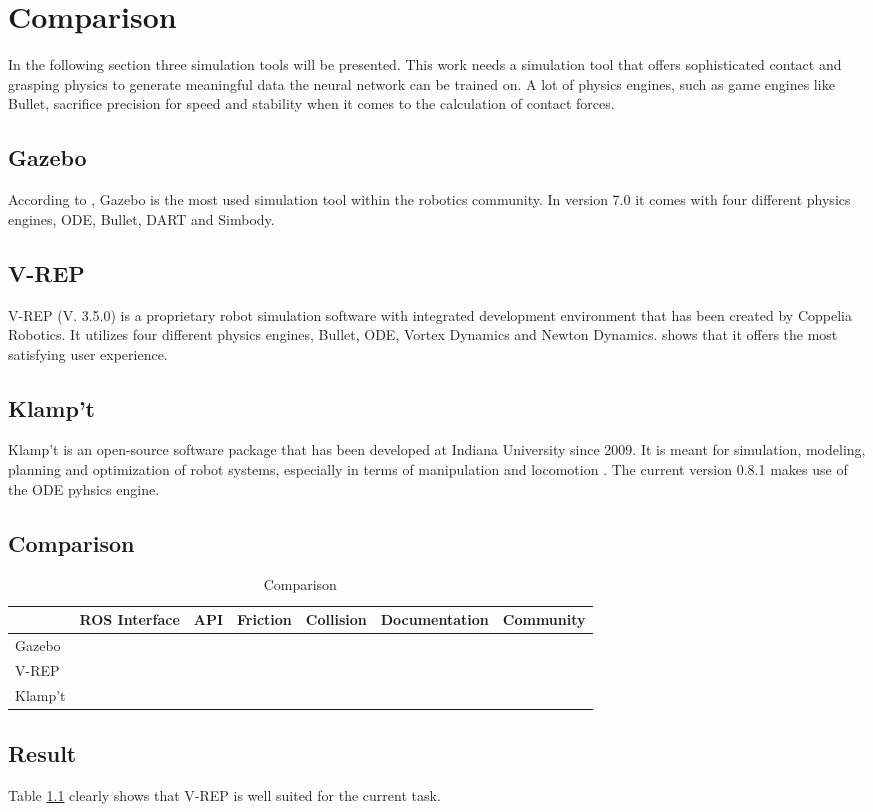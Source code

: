 \chapter{Comparison}
\label{chp:comparison}
In the following section three simulation tools will be presented. This work needs a simulation tool that offers sophisticated contact and grasping physics to generate meaningful data the neural network can be trained on. A lot of physics engines, such as game engines like Bullet, sacrifice precision for speed and stability when it comes to the calculation of contact forces.

\section{Gazebo}
\label{sec:gazebo}
According to \cite{ivaldi_tools_2014}, Gazebo is the most used simulation tool within the robotics community. In version 7.0 it comes with four different physics engines, ODE, Bullet, DART and Simbody.

\section{V-REP}
\label{sec:vrep}
V-REP (V. 3.5.0) is a proprietary robot simulation software with integrated development environment \cite{noauthor_v-rep_nodate} that has been created by Coppelia Robotics. It utilizes four different physics engines, Bullet, ODE, Vortex Dynamics and Newton Dynamics. \cite{ivaldi_tools_2014} shows that it offers the most satisfying user experience.

\section{Klamp't}
\label{sec:klampt}
Klamp't is an open-source software package that has been developed at Indiana University since 2009. It is meant for simulation, modeling, planning and optimization of robot systems, especially in terms of manipulation and locomotion \cite{inaba_robust_2016}.
The current version 0.8.1 makes use of the ODE pyhsics engine.

\newpage

\section{Comparison}
\label{sec:comparison}
\begin{table}[H]
\centering
\begin{tabular}{|l|c|c|c|c|c|c|}
	\hline
			& ROS Interface & API & Friction & Collision & Documentation & Community\\
	\hline
	Gazebo	& & & & & &\\
	V-REP	& & & & & &\\
	Klamp't	& & & & & &\\
	\hline
\end{tabular}
\caption{Comparison}
\label{tab:comparison}
\end{table}

\section{Result}
\label{sec:result}
Table \ref{tab:comparison} clearly shows that V-REP is well suited for the current task.